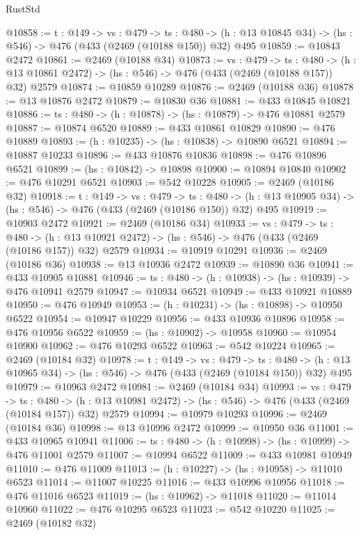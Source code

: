 \begin{lexlean}{RustStd}
\begin{coremodule}
@10858 := {t : @149} ->
  {vs : @479} ->
  {ts : @480} -> (h : @13 @10845 @34) -> (hs : @546) -> @476 (@433 (@2469 (@10188 @150)) @32) @495
@10859 := @10843 @2472
@10861 := @2469 (@10188 @34)
@10873 := {vs : @479} ->
  {ts : @480} ->
  (h : @13 @10861 @2472) -> (hs : @546) -> @476 (@433 (@2469 (@10188 @157)) @32) @2579
@10874 := @10859 @10289
@10876 := @2469 (@10188 @36)
@10878 := @13 @10876 @2472
@10879 := @10830 @36
@10881 := @433 @10845 @10821
@10886 := {ts : @480} -> (h : @10878) -> (hs : @10879) -> @476 @10881 @2579
@10887 := @10874 @6520
@10889 := @433 @10861 @10829
@10890 := @476 @10889
@10893 := (h : @10235) -> (hs : @10838) -> @10890 @6521
@10894 := @10887 @10233
@10896 := @433 @10876 @10836
@10898 := @476 @10896 @6521
@10899 := (hs : @10842) -> @10898
@10900 := @10894 @10840
@10902 := @476 @10291 @6521
@10903 := @542 @10228
@10905 := @2469 (@10186 @32)
@10918 := {t : @149} ->
  {vs : @479} ->
  {ts : @480} -> (h : @13 @10905 @34) -> (hs : @546) -> @476 (@433 (@2469 (@10186 @150)) @32) @495
@10919 := @10903 @2472
@10921 := @2469 (@10186 @34)
@10933 := {vs : @479} ->
  {ts : @480} ->
  (h : @13 @10921 @2472) -> (hs : @546) -> @476 (@433 (@2469 (@10186 @157)) @32) @2579
@10934 := @10919 @10291
@10936 := @2469 (@10186 @36)
@10938 := @13 @10936 @2472
@10939 := @10890 @36
@10941 := @433 @10905 @10881
@10946 := {ts : @480} -> (h : @10938) -> (hs : @10939) -> @476 @10941 @2579
@10947 := @10934 @6521
@10949 := @433 @10921 @10889
@10950 := @476 @10949
@10953 := (h : @10231) -> (hs : @10898) -> @10950 @6522
@10954 := @10947 @10229
@10956 := @433 @10936 @10896
@10958 := @476 @10956 @6522
@10959 := (hs : @10902) -> @10958
@10960 := @10954 @10900
@10962 := @476 @10293 @6522
@10963 := @542 @10224
@10965 := @2469 (@10184 @32)
@10978 := {t : @149} ->
  {vs : @479} ->
  {ts : @480} -> (h : @13 @10965 @34) -> (hs : @546) -> @476 (@433 (@2469 (@10184 @150)) @32) @495
@10979 := @10963 @2472
@10981 := @2469 (@10184 @34)
@10993 := {vs : @479} ->
  {ts : @480} ->
  (h : @13 @10981 @2472) -> (hs : @546) -> @476 (@433 (@2469 (@10184 @157)) @32) @2579
@10994 := @10979 @10293
@10996 := @2469 (@10184 @36)
@10998 := @13 @10996 @2472
@10999 := @10950 @36
@11001 := @433 @10965 @10941
@11006 := {ts : @480} -> (h : @10998) -> (hs : @10999) -> @476 @11001 @2579
@11007 := @10994 @6522
@11009 := @433 @10981 @10949
@11010 := @476 @11009
@11013 := (h : @10227) -> (hs : @10958) -> @11010 @6523
@11014 := @11007 @10225
@11016 := @433 @10996 @10956
@11018 := @476 @11016 @6523
@11019 := (hs : @10962) -> @11018
@11020 := @11014 @10960
@11022 := @476 @10295 @6523
@11023 := @542 @10220
@11025 := @2469 (@10182 @32)

\end{coremodule}
\end{lexlean}
